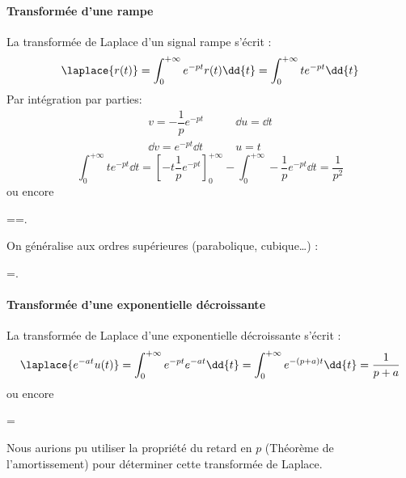 \paragraph{Transformée d'une rampe}
La transformée de Laplace d'un signal rampe s'écrit :
\[
\laplace{r(t)}=\int_{0}^{+\infty} e^{-pt}r(t)\dd{t}
=\int_{0}^{+\infty} te^{-pt}\dd{t}
\]
Par intégration par parties:
\begin{align*}
    v=-\dfrac{1}{p}e^{-pt}\qquad&\dd{u}=\dd{t}\\
    \dd{v}=e^{-pt}\dd{t}\qquad&u=t
\end{align*}
\[
\int_{0}^{+\infty} te^{-pt}\dd{t}
=\left[-t\dfrac{1}{p}e^{-pt}\right]_0^{+\infty}-\int_{0}^{+\infty}
-\dfrac{1}{p}e^{-pt}\dd{t}=\dfrac{1}{p^2}
\]
ou encore
\begin{bequation}
    ==.
\end{bequation}
On généralise aux ordres supérieures (\og parabolique\fg, \og 
cubique\fg\ldots) :
\begin{bequation}
    =.
\end{bequation}
\paragraph{Transformée d'une exponentielle décroissante}
La transformée de Laplace d'une exponentielle décroissante s'écrit :
\[
\laplace{e^{-at}u(t)}=\int_{0}^{+\infty} e^{-pt}e^{-at}\dd{t}
=\int_{0}^{+\infty} e^{-(p+a)t}\dd{t} = \dfrac{1}{p+a}
\]
ou encore
\begin{bequation}
    =
\end{bequation}
Nous aurions pu utiliser la propriété du retard en $p$ 
(Théorème de l'amortissement) pour déterminer cette transformée de Laplace.
